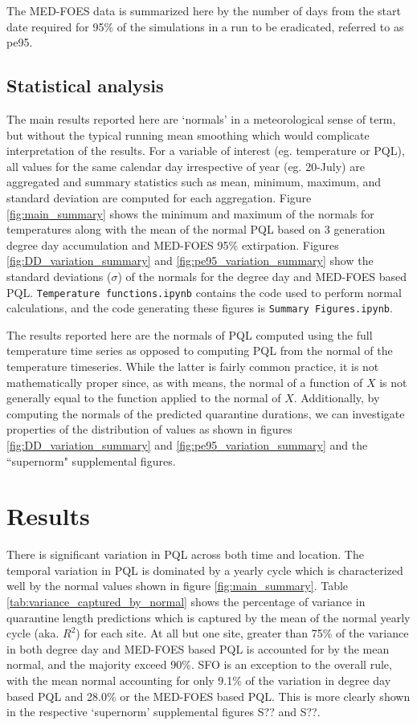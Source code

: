 \documentclass[10pt,a4paper,twocolumn]{article}
\begin{document}
The MED-FOES data is summarized here by the number of days from the start date required for
95\% of the simulations in a run to be eradicated, referred to as pe95.

\subsection*{Statistical analysis}

The main results reported here are `normals' in a meteorological sense of term,
but without the typical running mean smoothing which would complicate
interpretation of the results.
For a variable of interest (eg. temperature or PQL), 
all values for the same calendar day irrespective of year (eg. 20-July) are
aggregated and summary statistics such as mean, minimum, maximum, and standard deviation 
are computed for each aggregation.
Figure \ref{fig:main_summary} shows the minimum and maximum of the normals for temperatures
along with the mean of the normal PQL based on 3 generation degree day accumulation 
and MED-FOES 95\% extirpation.
Figures \ref{fig:DD_variation_summary} and \ref{fig:pe95_variation_summary} show the 
standard deviations ($\sigma$) of the normals for the degree day and MED-FOES based PQL.
\texttt{Temperature functions.ipynb} contains the code used to perform normal calculations, 
and the code generating these figures is \texttt{Summary Figures.ipynb}.

The results reported here are the normals of PQL computed using the full temperature time series
as opposed to computing PQL from the normal of the temperature timeseries.
While the latter is fairly common practice, it is not mathematically proper 
since, as with means, the normal of a function of $X$ is not generally equal to the function applied to the normal of $X$.
Additionally, by computing the normals of the predicted quarantine durations, 
we can investigate properties of the distribution of values as shown in 
figures \ref{fig:DD_variation_summary} and \ref{fig:pe95_variation_summary} and the ``supernorm" supplemental figures.


\section*{Results}

There is significant variation in PQL across both time and location.
The temporal variation in PQL is dominated by a yearly cycle
which is characterized well by the normal values shown in figure \ref{fig:main_summary}.
Table \ref{tab:variance_captured_by_normal} shows the percentage of variance in 
quarantine length predictions which is captured by the mean of the normal yearly cycle (aka. $R^2$) for each site.
At all but one site, greater than 75\% of the variance in both degree day and MED-FOES based PQL
is accounted for by the mean normal, and the majority exceed 90\%.
SFO is an exception to the overall rule, with the mean normal accounting for only 9.1\% of the variation in 
degree day based PQL and 28.0\% or the MED-FOES based PQL.
This is more clearly shown in the respective `supernorm' supplemental figures S?? and S??.
\end{document}
